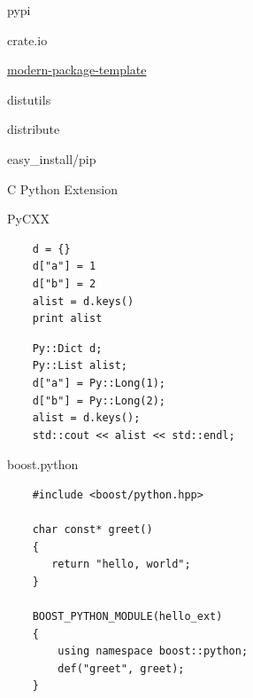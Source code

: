 \documentclass{article}
\begin{document}
\begin{center} pypi \end{center}
crate.io
\newpage

\begin{center} \href{http://pypi.python.org/pypi/modern-package-template/1.0}
                    {modern-package-template} \end{center}

\newpage

\begin{center} distutils \end{center}
\newpage

\begin{center} distribute \end{center}
\newpage 

\begin{center} easy\_install/pip \end{center}
\newpage 

\begin{center} C Python Extension \end{center}
\newpage

\begin{center} PyCXX \end{center}
\begin{lstlisting}
    d = {}
    d["a"] = 1
    d["b"] = 2
    alist = d.keys()
    print alist
\end{lstlisting}
\lstset{language=C++}
\begin{lstlisting}
    Py::Dict d;
    Py::List alist;
    d["a"] = Py::Long(1);
    d["b"] = Py::Long(2);
    alist = d.keys();
    std::cout << alist << std::endl;
\end{lstlisting}
\lstset{language=python}
\newpage

\begin{center} boost.python \end{center}
\lstset{language=C++}
\begin{lstlisting}
    #include <boost/python.hpp>

    char const* greet()
    {
       return "hello, world";
    }

    BOOST_PYTHON_MODULE(hello_ext)
    {
        using namespace boost::python;
        def("greet", greet);
    }
\end{lstlisting}
\lstset{language=python}
\newpage
\end{document}
